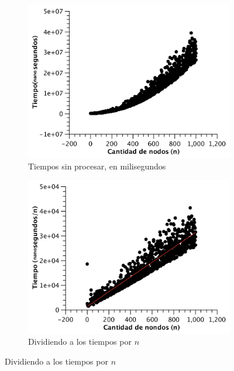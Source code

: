 \begin{figure}[H]
        \centering
\begin{subfigure}[b]{0.45\textwidth}
                \includegraphics[width=\textwidth]{imagenes/completo-matriz-1.pdf}
                \caption{Tiempos sin procesar, en milisegundos}
        \end{subfigure}%
        \begin{subfigure}[b]{0.45\textwidth}
                \includegraphics[width=\textwidth]{imagenes/completo-matriz-2.pdf}
                \caption{Dividiendo a los tiempos por $n$}
        \end{subfigure}

\end{figure}

